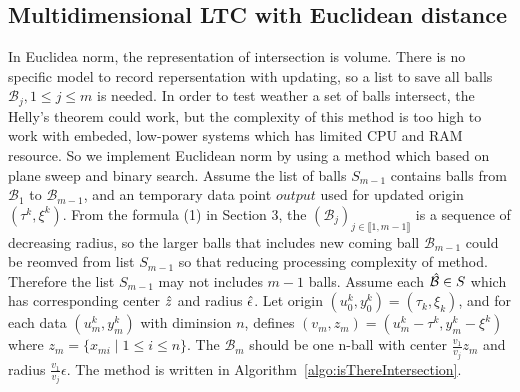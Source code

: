 \documentclass[10pt, conference, compsocconf]{IEEEtran}
\begin{document}
\subsection{Multidimensional LTC with Euclidean distance}
In Euclidea norm, the representation of intersection is
volume. There is no specific model to record repersentation
with updating, so a list to save all balls $\mathcal{B}_j, 1\leqslant{j}\leqslant{m}$
is needed. In order to test weather a set of balls intersect,
the Helly's theorem could work, but the complexity of
this method is too high to work with embeded, low-power
systems which has limited CPU and RAM resource. So we
implement Euclidean norm by using a method which based
on plane sweep and binary search. Assume the list of balls $S_{m-1}$ contains balls from $\mathcal{B}_1$ to $\mathcal{B}_{m-1}$, and an temporary data point $output$ used for updated origin $(\tau^k, \xi^k)$. From the formula (1) in Section 3, the $(\mathcal{B}_j)_{j \in \llbracket 1, {m-1} \rrbracket}$ is a sequence of decreasing radius, so the larger balls that includes new coming ball $\mathcal{B}_{m-1}$ could be reomved from list $S_{m-1}$ so that reducing processing complexity of method. Therefore the list $S_{m-1}$ may not includes $m-1$ balls. Assume each $\Hat{\mathcal{B}} \in S$ which has corresponding center $\Hat{z}$ and radius $\Hat{\epsilon}$.
Let origin $(u^k_0, y^k_0) = (\tau_k, \xi_k)$, and for each data $(u_m^k, y_m^k)$ with diminsion $n$, defines $(v_m, z_m) = (u_m^k - \tau^k, y_m^k - \xi^k)$ where $z_m = \{ x_{mi} \mid 1\leqslant{i}\leqslant{n}\}$. The $\mathcal{B}_{m}$ should be one n-ball with center $\frac{v_1}{v_j}z_m$ and radius $\frac{v_1}{v_j}\epsilon$. The method is written in Algorithm~\ref{algo:isThereIntersection}.
\end{document}
